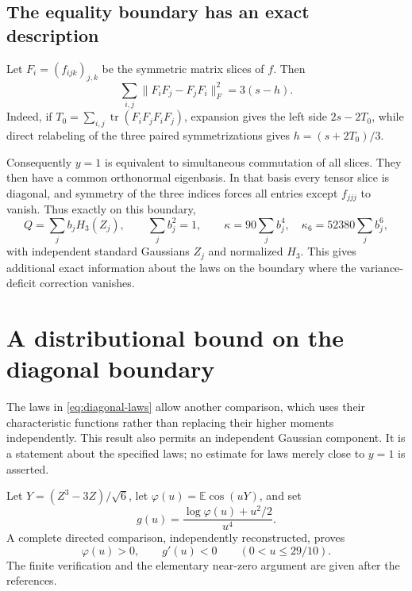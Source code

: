 \documentclass[11pt]{article}
\newcommand{\E}{\mathbb E}
\newcommand{\tr}{\operatorname{tr}}
\newcommand{\norm}[1]{\lVert #1\rVert}
\begin{document}
\subsection{The equality boundary has an exact description}
Let $F_i=(f_{ijk})_{j,k}$ be the symmetric matrix slices of $f$. Then
\begin{equation}\label{eq:commutators}
 \sum_{i,j}\norm{F_iF_j-F_jF_i}_F^2=3(s-h).
\end{equation}
Indeed, if $T_0=\sum_{i,j}\tr(F_iF_jF_iF_j)$, expansion gives the left side $2s-2T_0$, while direct relabeling of the three paired symmetrizations gives $h=(s+2T_0)/3$.

Consequently $y=1$ is equivalent to simultaneous commutation of all slices. They then have a common orthonormal eigenbasis. In that basis every tensor slice is diagonal, and symmetry of the three indices forces all entries except $f_{jjj}$ to vanish. Thus exactly on this boundary,
\begin{equation}\label{eq:diagonal-laws}
 Q=\sum_jb_jH_3(Z_j),\qquad \sum_jb_j^2=1,
 \qquad
 \kappa=90\sum_jb_j^4,\quad \kappa_6=52380\sum_jb_j^6,
\end{equation}
with independent standard Gaussians $Z_j$ and normalized $H_3$. This gives additional exact information about the laws on the boundary where the variance-deficit correction vanishes.

\section{A distributional bound on the diagonal boundary}
The laws in \eqref{eq:diagonal-laws} allow another comparison, which uses their characteristic functions rather than replacing their higher moments independently. This result also permits an independent Gaussian component. It is a statement about the specified laws; no estimate for laws merely close to $y=1$ is asserted.

Let $Y=(Z^3-3Z)/\sqrt6$, let $\varphi(u)=\E\cos(uY)$, and set
\begin{equation}\label{eq:cf-shape}
 g(u)=\frac{\log\varphi(u)+u^2/2}{u^4}.
\end{equation}
A complete directed comparison, independently reconstructed, proves
\begin{equation}\label{eq:cf-monotonic}
 \varphi(u)>0,\qquad g'(u)<0\qquad(0<u\le29/10).
\end{equation}
The finite verification and the elementary near-zero argument are given after the references.
\end{document}
